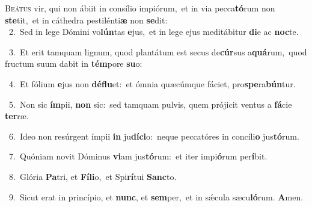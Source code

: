 \lettrine{\initial\textcolor{\initialcolor}{B}}{eátus} vir, qui non ábiit in consílio impiórum,~\dagger et in via pecca\-\textbf{tó}\-rum non \textbf{ste}\-tit,~\star et in cáthedra pestilénti\textbf{æ} non \textbf{se}\-dit:\\
{\numbfont\textcolor{\numbcolor}{~2.}}~Sed in lege Dómini vo\-\textbf{lún}\-tas \textbf{e}\-jus,~\star et in lege ejus meditábitur \textbf{di}\-e ac \textbf{noc}\-te.\par
{\numbfont\textcolor{\numbcolor}{~3.}}~Et erit tamquam lignum, quod plantátum est secus de\-\textbf{cúr}\-sus a\-\textbf{quá}\-rum,~\star quod fructum suum dabit in \textbf{tém}\-pore \textbf{su}\-o:\par
{\numbfont\textcolor{\numbcolor}{~4.}}~Et fólium \textbf{e}\-jus non \textbf{dé}\-\textbf{flu}et:~\star et ómnia quæcúmque fáciet, pro\-\textbf{spe}\-ra\-\textbf{bún}\-tur.\par
{\numbfont\textcolor{\numbcolor}{~5.}}~Non sic \textbf{ím}\-pii, \textbf{non} sic:~\star sed tamquam pulvis, quem prójicit ventus a \textbf{fá}\-cie \textbf{ter}\-ræ.\par
{\numbfont\textcolor{\numbcolor}{~6.}}~Ideo non resúrgent ímpii \textbf{in} ju\-\textbf{dí}\-\textbf{ci}o:~\star neque peccatóres in concíli\textbf{o} jus\-\textbf{tó}\-rum.\par
{\numbfont\textcolor{\numbcolor}{~7.}}~Quóniam novit Dóminus \textbf{vi}\-am jus\-\textbf{tó}\-rum:~\star et iter impi\-\textbf{ó}\-rum per\-\textbf{í}\-bit.\par
{\numbfont\textcolor{\numbcolor}{~8.}}~Glória \textbf{Pa}\-tri, et \textbf{Fí}\-\textbf{li}o,~\star et Spi\-\textbf{rí}\-tui \textbf{Sanc}\-to.\par
{\numbfont\textcolor{\numbcolor}{~9.}}~Sicut erat in princípio, et \textbf{nunc}\-, et \textbf{sem}\-per,~\star et in sǽcula sæcu\-\textbf{ló}\-rum. \textbf{A}\-men.\par
